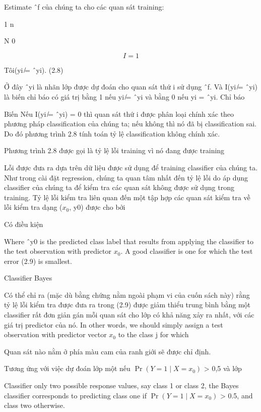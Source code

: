 Estimate ˆf của chúng ta cho các quan sát training:

1 n

N 0

\[I=1\]

Tôi(yi ̸= ˆyi). (2.8)

Ở đây ˆyi là nhãn lớp được dự đoán cho quan sát thứ i sử dụng ˆf. Và I(yi ̸= ˆyi) là biến chỉ báo có giá trị bằng 1 nếu yi ̸= ˆyi và bằng 0 nếu yi = ˆyi. Chỉ báo

Biến Nếu I(yi ̸= ˆyi) = 0 thì quan sát thứ i được phân loại chính xác theo phương pháp classification của chúng ta; nếu không thì nó đã bị classification sai. Do đó phương trình 2.8 tính toán tỷ lệ classification không chính xác.

Phương trình 2.8 được gọi là tỷ lệ lỗi training vì nó đang được training

Lỗi được đưa ra dựa trên dữ liệu được sử dụng để training classifier của chúng ta. Như trong cài đặt regression, chúng ta quan tâm nhất đến tỷ lệ lỗi do áp dụng classifier của chúng ta để kiểm tra các quan sát không được sử dụng trong training. Tỷ lệ lỗi kiểm tra liên quan đến một tập hợp các quan sát kiểm tra về lỗi kiểm tra dạng ($x_{0}$, y0) được cho bởi

Có điều kiện

Where ˆy0 is the predicted class label that results from applying the classifier to the test observation with predictor $x_{0}$. A good classifier is one for which the test error (2.9) is smallest.

Classifier Bayes

Có thể chỉ ra (mặc dù bằng chứng nằm ngoài phạm vi của cuốn sách này) rằng tỷ lệ lỗi kiểm tra được đưa ra trong (2.9) được giảm thiểu trung bình bằng một classifier rất đơn giản gán mỗi quan sát cho lớp có khả năng xảy ra nhất, với các giá trị predictor của nó. In other words, we should simply assign a test observation with predictor vector $x_{0}$ to the class j for which

Quan sát nào nằm ở phía màu cam của ranh giới sẽ được chỉ định.

Tương ứng với việc dự đoán lớp một nếu $\Pr(Y = 1 \mid X = x_{0})$ > 0,5 và lớp

Classifier only two possible response values, say class 1 or class 2, the Bayes classifier corresponds to predicting class one if $\Pr(Y = 1 \mid X = x_{0})$ > 0.5, and class two otherwise.

